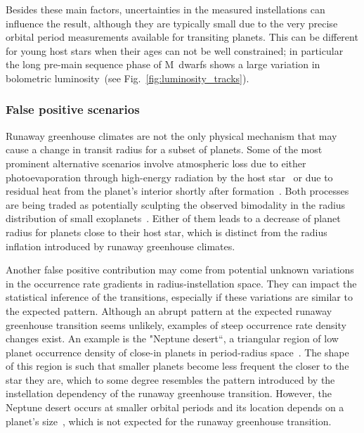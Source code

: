 \documentclass[modern]{aastex631}
\begin{document}
Besides these main factors, uncertainties in the measured instellations can influence the result, although they are typically small due to the very precise orbital period measurements available for transiting planets.
This can be different for young host stars when their ages can not be well constrained; in particular the long pre-main sequence phase of M~dwarfs shows a large variation in bolometric luminosity~(see Fig.~\ref{fig:luminosity_tracks}).


\subsubsection{False positive scenarios}
\begin{note}
    Runaway greenhouse climates are not the only physical mechanism that may cause a change in transit radius for a subset of planets.
    Some of the most prominent alternative scenarios involve atmospheric loss due to either photoevaporation through high-energy radiation by the host star~\citep[e.g.,][]{Owen2013,Jin2014,Mordasini2020a} or due to residual heat from the planet's interior shortly after formation~\citep{Ginzburg2016b,Ginzburg2018,Gupta2019}.
    Both processes are being traded as potentially sculpting the observed bimodality in the radius distribution of small exoplanets~\citep{Fulton2017,VanEylen2018}.
    Either of them leads to a decrease of planet radius for planets close to their host star, which is distinct from the radius inflation introduced by runaway greenhouse climates.

    Another false positive contribution may come from potential unknown variations in the occurrence rate gradients in radius-instellation space.
    They can impact the statistical inference of the transitions, especially if these variations are similar to the expected pattern.
    Although an abrupt pattern at the expected runaway greenhouse transition seems unlikely, examples of steep occurrence rate density changes exist.
    An example is the "Neptune desert``, a triangular region of low planet occurrence density of close-in planets in period-radius space~\citep{Szabo2011,Mazeh2016,Dreizler2020b}.
    The shape of this region is such that smaller planets become less frequent the closer to the star they are, which to some degree resembles the pattern introduced by the instellation dependency of the runaway greenhouse transition.
    However, the Neptune desert occurs at smaller orbital periods and its location depends on a planet's size~\citep{Szabo2011}, which is not expected for the runaway greenhouse transition.
\end{note}
\end{document}
